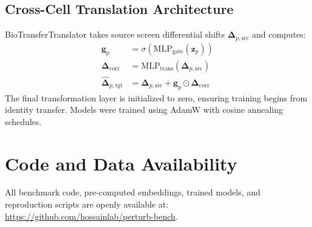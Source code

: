 \documentclass[11pt,letterpaper]{article}
\begin{document}
\subsection{Cross-Cell Translation Architecture}
BioTransferTranslator takes source screen differential shifts $\mathbf{\Delta}_{p, \text{src}}$ and computes:
\begin{align}
    \mathbf{g}_p &= \sigma\left(\text{MLP}_{\text{gate}}(\mathbf{z}_p)\right) \\
    \mathbf{\Delta}_{\text{corr}} &= \text{MLP}_{\text{trans}}(\mathbf{\Delta}_{p, \text{src}}) \\
    \mathbf{\hat{\Delta}}_{p, \text{tgt}} &= \mathbf{\Delta}_{p, \text{src}} + \mathbf{g}_p \odot \mathbf{\Delta}_{\text{corr}}
\end{align}
The final transformation layer is initialized to zero, ensuring training begins from identity transfer. Models were trained using AdamW with cosine annealing schedules.

\section*{Code and Data Availability}
All benchmark code, pre-computed embeddings, trained models, and reproduction scripts are openly available at: \url{https://github.com/hossainlab/perturb-bench}.



\end{document}
